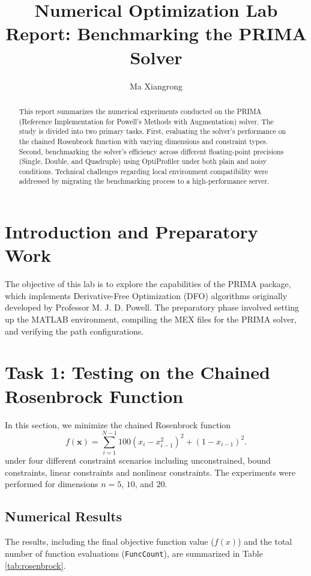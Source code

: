 \documentclass[11pt,a4paper]{article}
\title{\textbf{Numerical Optimization Lab Report: Benchmarking the PRIMA Solver}}
\author{Ma Xiangrong}
\begin{document}
\maketitle

\begin{abstract}
This report summarizes the numerical experiments conducted on the PRIMA (Reference Implementation for Powell's Methods with Augmentation) solver. The study is divided into two primary tasks. First, evaluating the solver's performance on the chained Rosenbrock function with varying dimensions and constraint types. Second, benchmarking the solver's efficiency across different floating-point precisions (Single, Double, and Quadruple) using OptiProfiler under both plain and noisy conditions. Technical challenges regarding local environment compatibility were addressed by migrating the benchmarking process to a high-performance server.
\end{abstract}

\section{Introduction and Preparatory Work}
The objective of this lab is to explore the capabilities of the PRIMA package, which implements Derivative-Free Optimization (DFO) algorithms originally developed by Professor M. J. D. Powell. The preparatory phase involved setting up the MATLAB environment, compiling the MEX files for the PRIMA solver, and verifying the path configurations. 
\section{Task 1: Testing on the Chained Rosenbrock Function }
In this section, we minimize the chained Rosenbrock function 
\[ 
f\left(\mathbf{x}\right)=\sum_{i=1}^{N-1}100\left(x_{i}-x_{i-1}^{2}\right)^{2}+\left(1-x_{i-1}\right)^{2}.
\]
under four different constraint scenarios including unconstrained, bound constraints, linear constraints and nonlinear constraints. The experiments were performed for dimensions $n = 5$, $10$, and $20$.

\subsection{Numerical Results}
The results, including the final objective function value ($f(x)$) and the total number of function evaluations (\texttt{FuncCount}), are summarized in Table \ref{tab:rosenbrock}.
\end{document}
